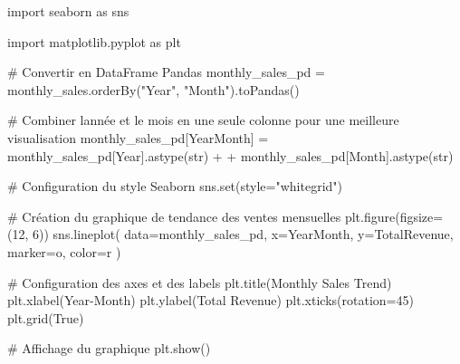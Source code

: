 \documentclass[
  letterpaper,
  DIV=11,
  numbers=noendperiod]{scrartcl}
\newenvironment{Shaded}{\begin{snugshade}}{\end{snugshade}}
\newcommand{\BuiltInTok}[1]{\textcolor[rgb]{0.00,0.23,0.31}{#1}}
\newcommand{\CommentTok}[1]{\textcolor[rgb]{0.37,0.37,0.37}{#1}}
\newcommand{\DecValTok}[1]{\textcolor[rgb]{0.68,0.00,0.00}{#1}}
\newcommand{\ImportTok}[1]{\textcolor[rgb]{0.00,0.46,0.62}{#1}}
\newcommand{\NormalTok}[1]{\textcolor[rgb]{0.00,0.23,0.31}{#1}}
\newcommand{\OperatorTok}[1]{\textcolor[rgb]{0.37,0.37,0.37}{#1}}
\newcommand{\StringTok}[1]{\textcolor[rgb]{0.13,0.47,0.30}{#1}}
\newcommand{\VariableTok}[1]{\textcolor[rgb]{0.07,0.07,0.07}{#1}}
\begin{document}
\begin{Shaded}
\begin{Highlighting}[]
\ImportTok{import}\NormalTok{ seaborn }\ImportTok{as}\NormalTok{ sns}

\ImportTok{import}\NormalTok{ matplotlib.pyplot }\ImportTok{as}\NormalTok{ plt}

\CommentTok{\# Convertir en DataFrame Pandas}
\NormalTok{monthly\_sales\_pd }\OperatorTok{=}\NormalTok{ monthly\_sales.orderBy(}\StringTok{"Year"}\NormalTok{, }\StringTok{"Month"}\NormalTok{).toPandas()}

\CommentTok{\# Combiner l\textquotesingle{}année et le mois en une seule colonne pour une meilleure visualisation}
\NormalTok{monthly\_sales\_pd[}\StringTok{\textquotesingle{}YearMonth\textquotesingle{}}\NormalTok{] }\OperatorTok{=}\NormalTok{ monthly\_sales\_pd[}\StringTok{\textquotesingle{}Year\textquotesingle{}}\NormalTok{].astype(}\BuiltInTok{str}\NormalTok{) }\OperatorTok{+} \StringTok{\textquotesingle{}{-}\textquotesingle{}} \OperatorTok{+}\NormalTok{ monthly\_sales\_pd[}\StringTok{\textquotesingle{}Month\textquotesingle{}}\NormalTok{].astype(}\BuiltInTok{str}\NormalTok{)}

\CommentTok{\# Configuration du style Seaborn}
\NormalTok{sns.}\BuiltInTok{set}\NormalTok{(style}\OperatorTok{=}\StringTok{"whitegrid"}\NormalTok{)}

\CommentTok{\# Création du graphique de tendance des ventes mensuelles}
\NormalTok{plt.figure(figsize}\OperatorTok{=}\NormalTok{(}\DecValTok{12}\NormalTok{, }\DecValTok{6}\NormalTok{))}
\NormalTok{sns.lineplot(}
\NormalTok{    data}\OperatorTok{=}\NormalTok{monthly\_sales\_pd,}
\NormalTok{    x}\OperatorTok{=}\StringTok{\textquotesingle{}YearMonth\textquotesingle{}}\NormalTok{,}
\NormalTok{    y}\OperatorTok{=}\StringTok{\textquotesingle{}TotalRevenue\textquotesingle{}}\NormalTok{,}
\NormalTok{    marker}\OperatorTok{=}\StringTok{\textquotesingle{}o\textquotesingle{}}\NormalTok{,}
\NormalTok{    color}\OperatorTok{=}\StringTok{\textquotesingle{}r\textquotesingle{}}
\NormalTok{)}

\CommentTok{\# Configuration des axes et des labels}
\NormalTok{plt.title(}\StringTok{\textquotesingle{}Monthly Sales Trend\textquotesingle{}}\NormalTok{)}
\NormalTok{plt.xlabel(}\StringTok{\textquotesingle{}Year{-}Month\textquotesingle{}}\NormalTok{)}
\NormalTok{plt.ylabel(}\StringTok{\textquotesingle{}Total Revenue\textquotesingle{}}\NormalTok{)}
\NormalTok{plt.xticks(rotation}\OperatorTok{=}\DecValTok{45}\NormalTok{)}
\NormalTok{plt.grid(}\VariableTok{True}\NormalTok{)}

\CommentTok{\# Affichage du graphique}
\NormalTok{plt.show()}
\end{Highlighting}
\end{Shaded}
\end{document}
